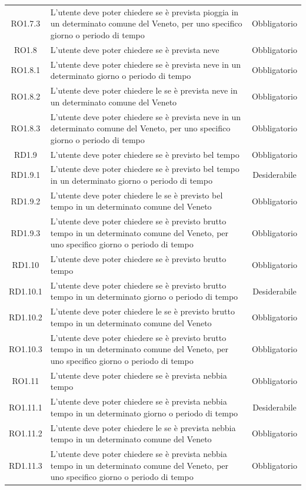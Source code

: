 \begin{longtable}{|c|>{\centering}m{7cm}|c|}
RO1.7.3 & L'utente deve poter chiedere se è prevista pioggia in un determinato comune del Veneto, per uno specifico giorno o periodo di tempo & Obbligatorio\\ 
RO1.8 & L'utente deve poter chiedere se è prevista neve & Obbligatorio\\ 
RO1.8.1 & L'utente deve poter chiedere se è prevista neve in un determinato giorno o periodo di tempo & Obbligatorio\\
RO1.8.2 & L'utente deve poter chiedere le se è prevista neve in un determinato comune del Veneto & Obbligatorio\\  
RO1.8.3 & L'utente deve poter chiedere se è prevista neve in un determinato comune del Veneto, per uno specifico giorno o periodo di tempo & Obbligatorio\\ 
RD1.9 & L'utente deve poter chiedere se è previsto bel tempo & Obbligatorio\\ 
RD1.9.1 & L'utente deve poter chiedere se è previsto bel tempo in un determinato giorno o periodo di tempo & Desiderabile\\
RD1.9.2 & L'utente deve poter chiedere le se è previsto bel tempo in un determinato comune del Veneto & Obbligatorio\\  
RD1.9.3 & L'utente deve poter chiedere se è previsto brutto tempo in un determinato comune del Veneto, per uno specifico giorno o periodo di tempo & Obbligatorio\\ 
RD1.10 & L'utente deve poter chiedere se è previsto brutto tempo & Obbligatorio\\ 
RD1.10.1 & L'utente deve poter chiedere se è previsto brutto tempo in un determinato giorno o periodo di tempo & Desiderabile\\
RD1.10.2 & L'utente deve poter chiedere le se è previsto brutto tempo in un determinato comune del Veneto & Obbligatorio\\  
RO1.10.3 & L'utente deve poter chiedere se è previsto brutto tempo in un determinato comune del Veneto, per uno specifico giorno o periodo di tempo & Obbligatorio\\ 
RO1.11 & L'utente deve poter chiedere se è prevista nebbia tempo & Obbligatorio\\ 
RO1.11.1 & L'utente deve poter chiedere se è prevista nebbia tempo in un determinato giorno o periodo di tempo & Desiderabile\\
RO1.11.2 & L'utente deve poter chiedere le se è prevista nebbia tempo in un determinato comune del Veneto & Obbligatorio\\  
RD1.11.3 & L'utente deve poter chiedere se è prevista nebbia tempo in un determinato comune del Veneto, per uno specifico giorno o periodo di tempo & Obbligatorio\\ 

\end{longtable}
